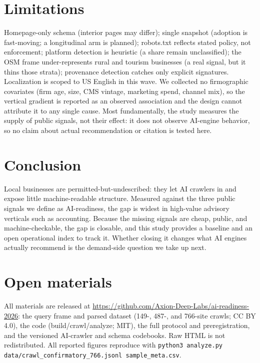 \documentclass[11pt]{article}
\begin{document}
\section{Limitations}

Homepage-only schema (interior pages may differ); single snapshot (adoption is fast-moving; a
longitudinal arm is planned); robots.txt reflects stated policy, not enforcement; platform detection
is heuristic (a share remain unclassified); the OSM frame under-represents rural and tourism
businesses (a real signal, but it thins those strata); provenance detection catches only explicit
signatures. Localization is scoped to US English in this wave. We collected no firmographic
covariates (firm age, size, CMS vintage, marketing spend, channel mix), so the vertical gradient is
reported as an observed association and the design cannot attribute it to any single cause. Most
fundamentally, the study measures the supply of public signals, not their effect: it does not observe
AI-engine behavior, so no claim about actual recommendation or citation is tested here.

\section{Conclusion}

Local businesses are permitted-but-undescribed: they let AI crawlers in and expose little
machine-readable structure. Measured against the three public signals we define as AI-readiness, the
gap is widest in high-value advisory verticals such as accounting. Because the missing signals are
cheap, public, and machine-checkable, the gap is closable, and this study provides a baseline and an
open operational index to track it. Whether closing it changes what AI engines actually recommend is
the demand-side question we take up next.

\section*{Open materials}

All materials are released at \url{https://github.com/Axion-Deep-Labs/ai-readiness-2026}: the query
frame and parsed dataset (149-, 487-, and 766-site crawls; CC BY 4.0), the code (build/crawl/analyze;
MIT), the full protocol and preregistration, and the versioned AI-crawler and schema codebooks. Raw
HTML is not redistributed. All reported figures reproduce with \texttt{python3 analyze.py
data/crawl\_confirmatory\_766.jsonl sample\_meta.csv}.
\end{document}
